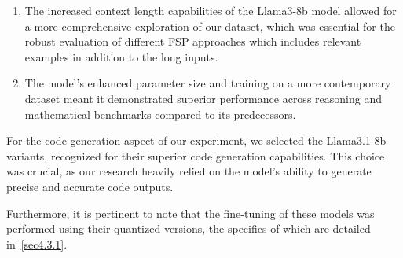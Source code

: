 \documentclass[logo,msc]{infthesis}           %
\begin{document}
\begin{enumerate}
    \item The increased context length capabilities of the Llama3-8b model allowed for a more comprehensive exploration of our dataset, which was essential for the robust evaluation of different FSP approaches which includes relevant examples in addition to the long inputs. 
     \item The model's enhanced parameter size and training on a more contemporary dataset meant it demonstrated superior performance across reasoning and mathematical benchmarks compared to its predecessors.
\end{enumerate}
For the code generation aspect of our experiment, we selected the Llama3.1-8b variants, recognized for their superior code generation capabilities. This choice was crucial, as our research heavily relied on the model's ability to generate precise and accurate code outputs.

Furthermore, it is pertinent to note that the fine-tuning of these models was performed using their quantized versions, the specifics of which are detailed in~\ref{sec4.3.1}. 
\end{document}
